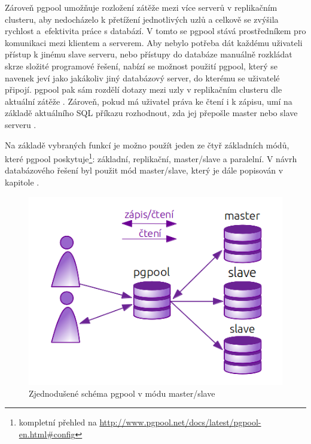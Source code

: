 Zároveň pgpool umožňuje rozložení zátěže mezi více serverů v replikačním clusteru, aby nedocházelo k přetížení jednotlivých uzlů a celkově se zvýšila rychlost a~efektivita práce s databází. V tomto se pgpool stává prostředníkem pro komunikaci mezi klientem a serverem. Aby nebylo potřeba dát každému uživateli přístup k jinému slave serveru, nebo přístupy do databáze manuálně rozkládat skrze složité programové řešení, nabízí se možnost použití pgpool, který se navenek jeví jako jakákoliv jiný databázový server, do kterému se uživatelé připojí. pgpool pak sám rozdělí dotazy mezi uzly v replikačním clusteru dle aktuální zátěže \citep{Boszormenyi2013}. Zároveň, pokud má uživatel práva ke čtení i k zápisu, umí na základě aktuálního SQL příkazu rozhodnout, zda jej přepošle master nebo slave serveru . 

Na základě vybraných funkcí je možno použít jeden ze čtyř základních módů, které pgpool poskytuje\footnote{kompletní přehled na \url{http://www.pgpool.net/docs/latest/pgpool-en.html\#config}}: základní, replikační, master/slave a paralelní. V návrh databázového řešení byl použit mód master/slave, který je dále popisován v kapitole .

      \begin{figure}[H]
        \centering
        \includegraphics[scale=1]{../../../grafy/obr/schema_pgpool.png}
        \caption{Zjednodušené schéma pgpool v módu master/slave}
        \label{opgpool}
      \end{figure}

